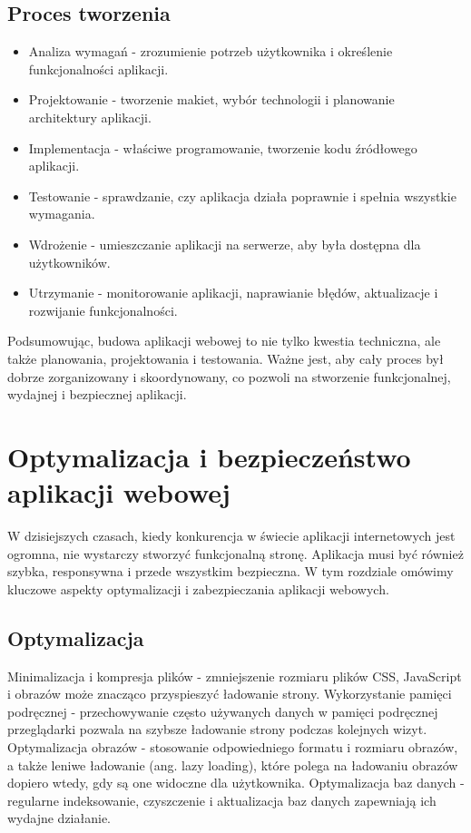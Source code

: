 \subsection{Proces tworzenia}

\begin{itemize}
\item Analiza wymagań - zrozumienie potrzeb użytkownika i określenie funkcjonalności aplikacji.
\item Projektowanie - tworzenie makiet, wybór technologii i planowanie architektury aplikacji.
\item Implementacja - właściwe programowanie, tworzenie kodu źródłowego aplikacji.
\item Testowanie - sprawdzanie, czy aplikacja działa poprawnie i spełnia wszystkie wymagania.
\item Wdrożenie - umieszczanie aplikacji na serwerze, aby była dostępna dla użytkowników.
\item Utrzymanie - monitorowanie aplikacji, naprawianie błędów, aktualizacje i rozwijanie funkcjonalności.
\end{itemize}

Podsumowując, budowa aplikacji webowej to nie tylko kwestia techniczna, ale także planowania, projektowania i testowania. Ważne jest, aby cały proces był dobrze zorganizowany i skoordynowany, co pozwoli na stworzenie funkcjonalnej, wydajnej i bezpiecznej aplikacji.

\section{Optymalizacja i bezpieczeństwo aplikacji webowej}

W dzisiejszych czasach, kiedy konkurencja w świecie aplikacji internetowych jest ogromna, nie wystarczy stworzyć funkcjonalną stronę. Aplikacja musi być również szybka, responsywna i przede wszystkim bezpieczna. W tym rozdziale omówimy kluczowe aspekty optymalizacji i zabezpieczania aplikacji webowych.

\subsection{Optymalizacja}

Minimalizacja i kompresja plików - zmniejszenie rozmiaru plików CSS, JavaScript i obrazów może znacząco przyspieszyć ładowanie strony.
Wykorzystanie pamięci podręcznej - przechowywanie często używanych danych w pamięci podręcznej przeglądarki pozwala na szybsze ładowanie strony podczas kolejnych wizyt.
Optymalizacja obrazów - stosowanie odpowiedniego formatu i rozmiaru obrazów, a także leniwe ładowanie (ang. lazy loading), które polega na ładowaniu obrazów dopiero wtedy, gdy są one widoczne dla użytkownika.
Optymalizacja baz danych - regularne indeksowanie, czyszczenie i aktualizacja baz danych zapewniają ich wydajne działanie.

